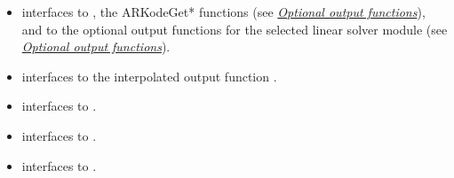 \documentclass[letterpaper,10pt,english]{sphinxmanual}
\begin{document}
\begin{itemize}
\item {} 
{\hyperref[f_interface/Usage:f/_/FARKODE]{}} interfaces to {\hyperref[c_interface/User_callable:ARKode]{}}, the
ARKodeGet* functions (see {\hyperref[c_interface/User_callable:cinterface-optionaloutputs]{\emph{Optional output functions}}}),
and to the optional output functions for the selected linear
solver module (see {\hyperref[c_interface/User_callable:cinterface-optionaloutputs]{\emph{Optional output functions}}}).

\item {} 
{\hyperref[f_interface/Usage:f/_/FARKDKY]{}} interfaces to the interpolated output function
{\hyperref[c_interface/User_callable:ARKodeGetDky]{}}.

\item {} 
{\hyperref[f_interface/Optional_output:f/_/FARKGETERRWEIGHTS]{}} interfaces to
{\hyperref[c_interface/User_callable:ARKodeGetErrWeights]{}}.

\item {} 
{\hyperref[f_interface/Optional_output:f/_/FARKGETESTLOCALERR]{}} interfaces to
{\hyperref[c_interface/User_callable:ARKodeGetEstLocalErrors]{}}.

\item {} 
{\hyperref[f_interface/Usage:f/_/FARKFREE]{}} interfaces to {\hyperref[c_interface/User_callable:ARKodeFree]{}}.

\end{itemize}
\end{document}
